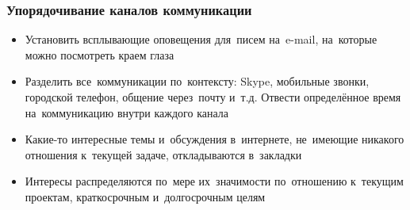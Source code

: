 \documentclass{../industrial-development}
\begin{document}
\begin{frame} \frametitle{Упорядочивание каналов коммуникации}
  \begin{itemize}
  \item Установить всплывающие оповещения для~писем на~e-mail, на~которые можно посмотреть краем глаза
  \item Разделить все~коммуникации по~контексту: Skype, мобильные звонки, городской телефон, общение через~почту и~т.д. Отвести определённое время на~коммуникацию внутри каждого канала
  \item Какие-то интересные темы и~обсуждения в~интернете, не~имеющие никакого отношения к~текущей задаче, откладываются в~закладки
  \item Интересы распределяются по~мере их~значимости по~отношению к~текущим проектам, краткосрочным и~долгосрочным целям
  \end{itemize}
\end{frame}

\lecturenotes
\end{document}
